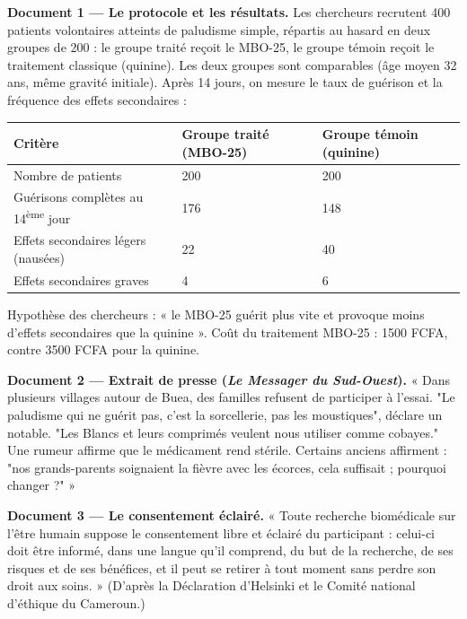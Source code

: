 \documentclass[11pt]{article}
\newcommand{\cle}[1]{{\popxbold\color{popdark}#1}}
\newcounter{popsec}
\newcounter{popsub}
\newcommand{\courssub}[1]{%
  \stepcounter{popsub}%
  \par\vspace{9pt}\noindent{\popxbold\fontsize{11.5}{13}\selectfont\color{popink}{\color{poporange}\thepopsec.\thepopsub}\hspace{6pt}#1}\par\nopagebreak\vspace{4pt}
}
\begin{document}
\textbf{Document 1 — Le protocole et les résultats.} Les chercheurs recrutent 400 patients volontaires atteints de paludisme simple, répartis au hasard en deux groupes de 200 : le \cle{groupe traité} reçoit le MBO-25, le \cle{groupe témoin} reçoit le traitement classique (quinine). Les deux groupes sont comparables (âge moyen 32 ans, même gravité initiale). Après 14 jours, on mesure le taux de guérison et la fréquence des effets secondaires :

\begin{center}
\begin{tabularx}{\linewidth}{|l|X|X|}
\hline
\rowcolor{popblueL} \textbf{Critère} & \textbf{Groupe traité (MBO-25)} & \textbf{Groupe témoin (quinine)} \\
\hline
Nombre de patients & 200 & 200 \\
\hline
Guérisons complètes au 14\textsuperscript{ème} jour & 176 & 148 \\
\hline
Effets secondaires légers (nausées) & 22 & 40 \\
\hline
Effets secondaires graves & 4 & 6 \\
\hline
\end{tabularx}
\end{center}

Hypothèse des chercheurs : « le MBO-25 guérit plus vite et provoque moins d'effets secondaires que la quinine ». Coût du traitement MBO-25 : \num{1500} FCFA, contre \num{3500} FCFA pour la quinine.

\textbf{Document 2 — Extrait de presse (\emph{Le Messager du Sud-Ouest}).} « Dans plusieurs villages autour de Buea, des familles refusent de participer à l'essai. "Le paludisme qui ne guérit pas, c'est la sorcellerie, pas les moustiques", déclare un notable. "Les Blancs et leurs comprimés veulent nous utiliser comme cobayes." Une rumeur affirme que le médicament rend stérile. Certains anciens affirment : "nos grands-parents soignaient la fièvre avec les écorces, cela suffisait ; pourquoi changer ?" »

\textbf{Document 3 — Le consentement éclairé.} « Toute recherche biomédicale sur l'être humain suppose le \cle{consentement libre et éclairé} du participant : celui-ci doit être informé, dans une langue qu'il comprend, du but de la recherche, de ses risques et de ses bénéfices, et il peut se retirer à tout moment sans perdre son droit aux soins. » (D'après la Déclaration d'Helsinki et le Comité national d'éthique du Cameroun.)

\courssub{Consignes}
\end{document}
